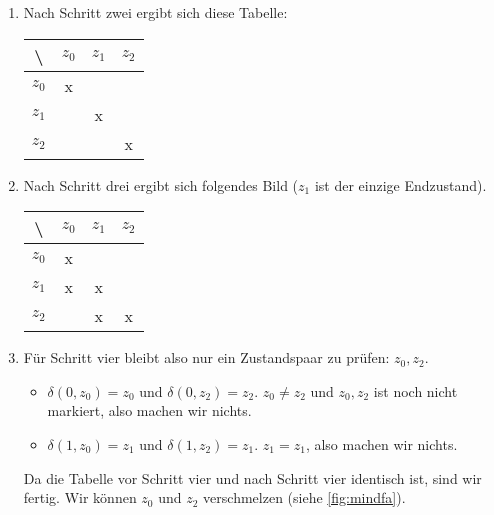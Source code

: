 \begin{enumerate}
    \item Nach Schritt zwei ergibt sich diese Tabelle:
        \begin{table}[H]
            \centering
            \begin{tabular}{|c|c|c|c|}
            \hline
                \textbackslash  & $z_0$   & $z_1$               & $z_2$ \\ \hline
                $z_0$           & x       & \cellcolor{gray}    & \cellcolor{gray} \\ \hline
                $z_1$           &         & x                   & \cellcolor{gray} \\ \hline
                $z_2$           &         &                     & x \\ \hline
            \end{tabular}
            \label{tab:mintab2}
        \end{table}
    \item Nach Schritt drei ergibt sich folgendes Bild ($z_1$ ist der einzige Endzustand).
        \begin{table}[H]
            \centering
            \begin{tabular}{|c|c|c|c|}
            \hline
                \textbackslash  & $z_0$   & $z_1$               & $z_2$ \\ \hline
                $z_0$           & x       & \cellcolor{gray}    & \cellcolor{gray} \\ \hline
                $z_1$           & x       & x                   & \cellcolor{gray} \\ \hline
                $z_2$           &         & x                   & x \\ \hline
            \end{tabular}
            \label{tab:mintab3}
        \end{table}
    \item Für Schritt vier bleibt also nur ein Zustandspaar zu prüfen: $z_0, z_2$.
        \begin{itemize}
            \item $\delta(0, z_0) = z_0$ und $\delta(0, z_2) = z_2$. 
                $z_0 \neq z_2$ und $z_0, z_2$ ist noch nicht markiert,
                also machen wir nichts.
            \item $\delta(1, z_0) = z_1$ und $\delta(1, z_2) = z_1$. 
                $z_1 = z_1$, also machen wir nichts.
        \end{itemize}
        Da die Tabelle vor Schritt vier und nach Schritt vier identisch ist,
        sind wir fertig. Wir können $z_0$ und $z_2$ verschmelzen
        (siehe \autoref{fig:mindfa}).
\end{enumerate}

